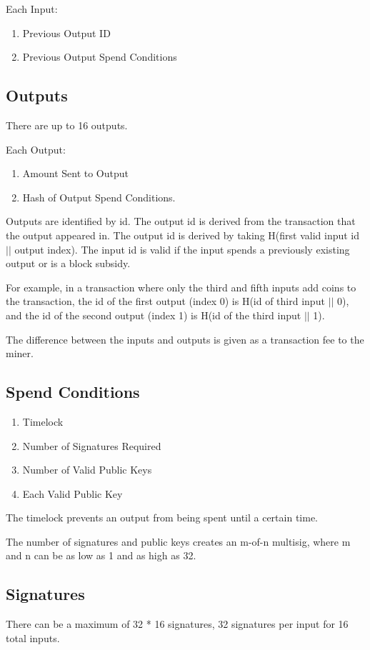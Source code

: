 \documentclass[twocolumn]{article}
\begin{document}
Each Input:
\begin{enumerate}
	\item Previous Output ID
	\item Previous Output Spend Conditions
\end{enumerate}

\subsection{Outputs}
There are up to 16 outputs.

Each Output:
\begin{enumerate}
	\item Amount Sent to Output
	\item Hash of Output Spend Conditions.
\end{enumerate}

Outputs are identified by id.
The output id is derived from the transaction that the output appeared in.
The output id is derived by taking H(first valid input id $||$ output index).
The input id is valid if the input spends a previously existing output or is a block subsidy.

For example, in a transaction where only the third and fifth inputs add coins to the transaction, the id of the first output (index 0) is H(id of third input $||$ 0), and the id of the second output (index 1) is H(id of the third input $||$ 1).

The difference between the inputs and outputs is given as a transaction fee to the miner.

\subsection{Spend Conditions}
\begin{enumerate}
	\item Timelock
	\item Number of Signatures Required
	\item Number of Valid Public Keys
	\item Each Valid Public Key
\end{enumerate}

The timelock prevents an output from being spent until a certain time.

The number of signatures and public keys creates an m-of-n multisig, where m and n can be as low as 1 and as high as 32.

\subsection{Signatures}
There can be a maximum of 32 * 16 signatures, 32 signatures per input for 16 total inputs.
\end{document}
